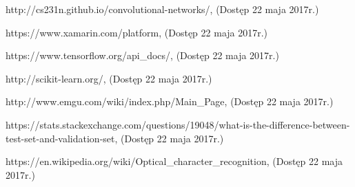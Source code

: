 \documentclass[brudnopis]{xmgr}
\begin{document}
\begin{thebibliography}{9}
  http://cs231n.github.io/convolutional-networks/, 
  (Dostęp 22 maja 2017r.)

  https://www.xamarin.com/platform, 
  (Dostęp 22 maja 2017r.)

  https://www.tensorflow.org/api\_docs/, 
  (Dostęp 22 maja 2017r.)

  http://scikit-learn.org/, 
  (Dostęp 22 maja 2017r.)  

  http://www.emgu.com/wiki/index.php/Main\_Page, 
  (Dostęp 22 maja 2017r.)
  
  https://stats.stackexchange.com/questions/19048/what-is-the-difference-between-test-set-and-validation-set, 
  (Dostęp 22 maja 2017r.)

  https://en.wikipedia.org/wiki/Optical\_character\_recognition, 
  (Dostęp 22 maja 2017r.)

\end{thebibliography}

\oswiadczenie
\end{document}
